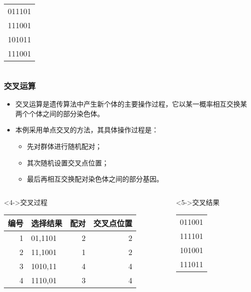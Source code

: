 \documentclass{beamer}
\begin{document}
\begin{frame}
\begin{columns}
\begin{column}{0.15\textwidth}
\begin{block}
\begin{center}
\begin{tabular}{r}
 011101  \\
 111001  \\
 101011  \\
 111001  \\
\end{tabular}
\end{center}
\end{block}
\end{column}
\end{columns}
\end{frame}
\begin{frame}
\frametitle{交叉运算}
\label{sec-2-6}

\begin{itemize}
\item <2-> 交叉运算是遗传算法中产生新个体的主要操作过程，它以某一概率相互交换某两个个体之间的部分染色体。
\item <3-> 本例采用单点交叉的方法，其具体操作过程是：
\begin{itemize}
\item 先对群体进行随机配对；
\item 其次随机设置交叉点位置；
\item 最后再相互交换配对染色体之间的部分基因。
\end{itemize}
\end{itemize}
\begin{columns}
\begin{column}{0.8\textwidth}
\begin{block}<4->{交叉过程}
\label{sec-2-6-1}


\begin{center}
\begin{tabular}{rlrr}
 编号  &  选择结果  &  配对  &  交叉点位置  \\
\hline
    1  &  01,1101   &     2  &           2  \\
    2  &  11,1001   &     1  &           2  \\
    3  &  1010,11   &     4  &           4  \\
    4  &  1110,01   &     3  &           4  \\
\end{tabular}
\end{center}
\end{block}
\end{column}
\begin{column}{0.15\textwidth}
\begin{block}<5->{交叉结果}
\label{sec-2-6-2}


\begin{center}
\begin{tabular}{r}
 011001  \\
 111101  \\
 101001  \\
 111011  \\
\end{tabular}
\end{center}
\end{block}
\end{column}
\end{columns}
\end{frame}
\end{document}
